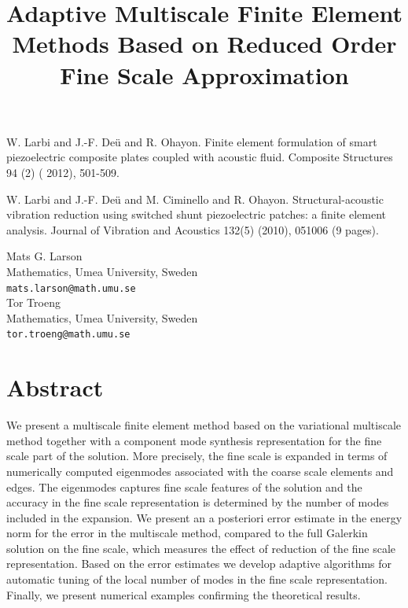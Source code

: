 \documentclass[article, A4, 11pt]{llncs}%
\begin{document}

\begin{thebibliography}{10}
{\sc W. Larbi and J.-F. De\"{u} and R. Ohayon}. {Finite element formulation of smart piezoelectric composite plates coupled with acoustic fluid}. Composite Structures 94 (2) ( 2012), 501-509.

{\sc W. Larbi and J.-F. De\"{u} and M. Ciminello and R. Ohayon}. {Structural-acoustic vibration reduction using switched shunt piezoelectric patches: a finite element analysis}. Journal of Vibration and Acoustics 132(5) (2010), 051006 (9 pages).
\end{thebibliography} %

\title{Adaptive Multiscale Finite Element Methods Based on Reduced Order Fine Scale Approximation}
 \author{} \institute{}
\maketitle
\begin{center}
{\large Mats G. Larson}\\
Mathematics, Umea University, Sweden\\
{\tt mats.larson@math.umu.se}
\\ \vspace{4mm}
{\large Tor Troeng}\\
Mathematics, Umea University, Sweden\\
{\tt tor.troeng@math.umu.se}
\end{center}

\section*{Abstract}
We present a multiscale finite element method based on the variational multiscale method together with a component mode synthesis representation for the fine scale part of the solution. More precisely, the fine scale is expanded in terms of numerically computed eigenmodes associated with the coarse scale elements and edges. The eigenmodes captures fine scale features of the solution and the accuracy in the fine scale representation is determined by the number of modes included in the expansion. We present an a posteriori error estimate in the energy norm for the error in the multiscale method, compared to the full Galerkin solution on the fine scale, which measures the effect of reduction of the fine scale representation. Based on the error estimates we develop adaptive algorithms for automatic tuning of the local number of modes in the fine scale representation. Finally, we present numerical examples confirming the theoretical results.
\end{document}
